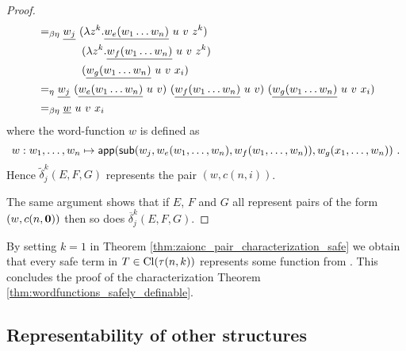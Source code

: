 \begin{proof}
\begin{align*}
%
   &=_{\beta\eta} \zaioncencode{w_j}\  (\lambda z^k. \zaioncencode{w_e(w_1\ldots w_n)}~u~v~z^k) \\
       & \qquad\qquad (\lambda z^k. \zaioncencode{w_f(w_1\ldots w_n)}~u~v~z^k) \\
       & \qquad\qquad (\zaioncencode{w_g(w_1\ldots w_n)}~u~v~x_i)\\
%
   &=_\eta \zaioncencode{w_j}\  (\zaioncencode{w_e(w_1\ldots w_n)}~u~v)  \ (\zaioncencode{w_f(w_1\ldots w_n)}~u~v) \  (\zaioncencode{w_g(w_1\ldots w_n)}~u~v~x_i)\\
%
   &=_{\beta\eta}  \zaioncencode{w}~u~v~ x_i
 \end{align*} 
where the word-function $w$ is defined as
$$w: w_1,\ldots,w_n \mapsto {\sf app}({\sf sub}(w_j,w_e(w_1,\ldots,w_n),w_f(w_1,\ldots,w_n)),w_g(x_1,\ldots,w_n)) \ .$$
  Hence $\widetilde \delta^k_j (E,F,G)$ represents the pair $(w,c(n,i))$.
  
  The same argument shows that if $E$, $F$ and $G$ all represent pairs
of the form $(w,c(n,\mathbf{0}))$ then so does $\overline \delta^k_j (E,F,G)$.
\end{proof}


By setting $k=1$ in Theorem \ref{thm:zaionc_pair_characterization_safe} we obtain that every safe term in $T \in {\rm Cl}(\tau(n,k))$ represents some function from \safedefset. This concludes the proof of the characterization Theorem \ref{thm:wordfunctions_safely_definable}.


\subsection{Representability of other structures}